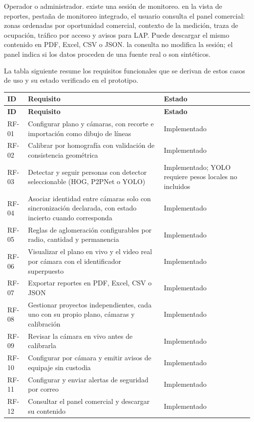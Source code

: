   {Operador o administrador.}
  {existe una sesión de monitoreo.}
  {en la vista de reportes, pestaña de monitoreo integrado, el usuario
   consulta el panel comercial: zonas ordenadas por oportunidad comercial,
   contexto de la medición, traza de ocupación, tráfico por acceso y avisos
   para LAP. Puede descargar el mismo contenido en PDF, Excel, CSV o JSON.}
  {la consulta no modifica la sesión; el panel indica si los datos
   proceden de una fuente real o son sintéticos.}

La tabla siguiente resume los requisitos funcionales que se derivan de
estos casos de uso y su estado verificado en el prototipo.

{\small
\setlength{\LTleft}{0pt}\setlength{\LTright}{0pt}
\begin{longtable}{@{}L{1.4cm}L{\dimexpr\linewidth-5.4cm-4\tabcolsep\relax}L{4.0cm}@{}}
\toprule
\textbf{ID} & \textbf{Requisito} & \textbf{Estado} \\
\midrule
\endfirsthead
\toprule
\textbf{ID} & \textbf{Requisito} & \textbf{Estado} \\
\midrule
\endhead
\bottomrule
\endlastfoot
RF-01 & Configurar plano y cámaras, con recorte e importación como dibujo de
líneas & Implementado \\
\addlinespace
RF-02 & Calibrar por homografía con validación de consistencia geométrica &
Implementado \\
\addlinespace
RF-03 & Detectar y seguir personas con detector seleccionable (HOG,
P2PNet o YOLO) & Implementado; YOLO requiere pesos locales no incluidos \\
\addlinespace
RF-04 & Asociar identidad entre cámaras solo con sincronización declarada,
con estado incierto cuando corresponda & Implementado \\
\addlinespace
RF-05 & Reglas de aglomeración configurables por radio, cantidad y
permanencia & Implementado \\
\addlinespace
RF-06 & Visualizar el plano en vivo y el video real por cámara con el
identificador superpuesto & Implementado \\
\addlinespace
RF-07 & Exportar reportes en PDF, Excel, CSV o JSON & Implementado \\
\addlinespace
RF-08 & Gestionar proyectos independientes, cada uno con su propio plano,
cámaras y calibración & Implementado \\
\addlinespace
RF-09 & Revisar la cámara en vivo antes de calibrarla & Implementado \\
\addlinespace
RF-10 & Configurar por cámara y emitir avisos de equipaje sin custodia &
Implementado \\
\addlinespace
RF-11 & Configurar y enviar alertas de seguridad por correo &
Implementado \\
\addlinespace
RF-12 & Consultar el panel comercial y descargar su contenido &
Implementado \\
\end{longtable}
}

